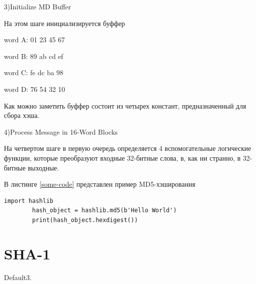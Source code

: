 \documentclass[a4paper, 12pt, oneside]{scrartcl}
\begin{document}
	3)Initialize MD Buffer\par
	На этом шаге инициализируется буффер\par
	word A: 01 23 45 67\par
	word B: 89 ab cd ef\par
	word C: fe dc ba 98\par
	word D: 76 54 32 10\par
	Как можно заметить буффер состоит из четырех констант, предназначенный для сбора хэша.\par
	4)Process Message in 16-Word Blocks\par
	На четвертом шаге в первую очередь определяется 4 вспомогательные логические функции, которые преобразуют входные 32-битные слова, в, как ни странно, в 32-битные выходные.\par

	В листинге \ref{some-code} представлен пример MD5-хэширования\par
	
	\begin{lstlisting}[label=some-code,caption= MD5]
		import hashlib
		hash_object = hashlib.md5(b'Hello World')
		print(hash_object.hexdigest())
	\end{lstlisting}
	\section{SHA-1}\label{sec:section3}
	Default3.
	
	
	
\end{document}
